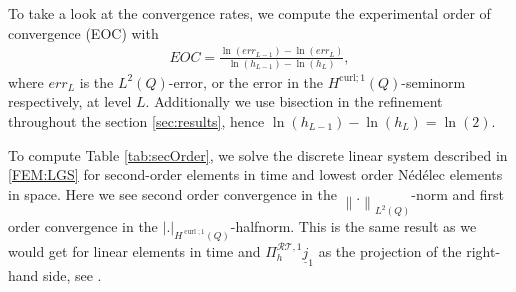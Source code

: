 \documentclass[a4paper,11pt]{article}
\newcommand{\cu}{\operatorname{curl}}
\renewcommand{\vec}[1]{\underline{#1}}
\newcommand{\abs}[1]{\left\lvert{#1}\right\rvert}
\newcommand{\norm}[1]{{\left\lVert{#1}\right\rVert}}
\begin{document}
To take a look at the convergence rates,  we compute the experimental order of convergence (EOC) with
\begin{align*}
	EOC = \frac{\ln(err_{L-1}) - \ln(err_{L}) }{\ln(h_{L-1})-\ln(h_{L})},
\end{align*}
where $err_{L}$ is the $L^2(Q)$-error, or the  error in the $H^{\mathrm{curl};1}(Q)$-seminorm respectively, at level $L$. Additionally we use bisection in the refinement throughout the section \ref{sec:results}, hence $\ln(h_{L-1})-\ln(h_{L}) = \ln(2)$.

To compute Table \ref{tab:secOrder}, we solve the discrete linear system described in \eqref{FEM:LGS} for second-order elements in time and lowest order Nédélec elements in space. Here we see second order convergence in the $\norm{.}_{L^2(Q)}$-norm and first order convergence in the  $\abs{.}_{H^{\cu;1}(Q)}$-halfnorm. This is the same result as we would get for linear elements in time and $\Pi_h^{\mathcal{RT},1} \vec j_1$  as the projection of the right-hand side, see \cite{HauserZank2023}.
\end{document}
